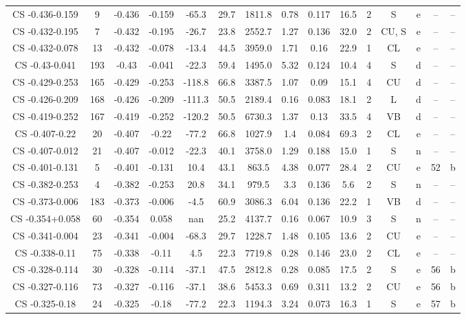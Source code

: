 \begin{table}
\begin{tabular}{ccccccccccccccc}
CS -0.436-0.159 & 9 & -0.436 & -0.159 & -65.3 & 29.7 & 1811.8 & 0.78 & 0.117 & 16.5 & 2 & S & e & -- & -- \\
CS -0.432-0.195 & 7 & -0.432 & -0.195 & -26.7 & 23.8 & 2552.7 & 1.27 & 0.136 & 32.0 & 2 & CU, S & e & -- & -- \\
CS -0.432-0.078 & 13 & -0.432 & -0.078 & -13.4 & 44.5 & 3959.0 & 1.71 & 0.16 & 22.9 & 1 & CL & e & -- & -- \\
CS -0.43-0.041 & 193 & -0.43 & -0.041 & -22.3 & 59.4 & 1495.0 & 5.32 & 0.124 & 10.4 & 4 & S & d & -- & -- \\
CS -0.429-0.253 & 165 & -0.429 & -0.253 & -118.8 & 66.8 & 3387.5 & 1.07 & 0.09 & 15.1 & 4 & CU & d & -- & -- \\
CS -0.426-0.209 & 168 & -0.426 & -0.209 & -111.3 & 50.5 & 2189.4 & 0.16 & 0.083 & 18.1 & 2 & L & d & -- & -- \\
CS -0.419-0.252 & 167 & -0.419 & -0.252 & -120.2 & 50.5 & 6730.3 & 1.37 & 0.13 & 33.5 & 4 & VB & d & -- & -- \\
CS -0.407-0.22 & 20 & -0.407 & -0.22 & -77.2 & 66.8 & 1027.9 & 1.4 & 0.084 & 69.3 & 2 & CL & e & -- & -- \\
CS -0.407-0.012 & 21 & -0.407 & -0.012 & -22.3 & 40.1 & 3758.0 & 1.29 & 0.188 & 15.0 & 1 & S & n & -- & -- \\
CS -0.401-0.131 & 5 & -0.401 & -0.131 & 10.4 & 43.1 & 863.5 & 4.38 & 0.077 & 28.4 & 2 & CU & e & 52 & b \\
CS -0.382-0.253 & 4 & -0.382 & -0.253 & 20.8 & 34.1 & 979.5 & 3.3 & 0.136 & 5.6 & 2 & S & n & -- & -- \\
CS -0.373-0.006 & 183 & -0.373 & -0.006 & -4.5 & 60.9 & 3086.3 & 6.04 & 0.136 & 22.2 & 1 & VB & d & -- & -- \\
CS -0.354+0.058 & 60 & -0.354 & 0.058 & nan & 25.2 & 4137.7 & 0.16 & 0.067 & 10.9 & 3 & S & n & -- & -- \\
CS -0.341-0.004 & 23 & -0.341 & -0.004 & -68.3 & 29.7 & 1228.7 & 1.48 & 0.105 & 13.6 & 2 & CU & e & -- & -- \\
CS -0.338-0.11 & 75 & -0.338 & -0.11 & 4.5 & 22.3 & 7719.8 & 0.28 & 0.146 & 23.0 & 2 & CL & e & -- & -- \\
CS -0.328-0.114 & 30 & -0.328 & -0.114 & -37.1 & 47.5 & 2812.8 & 0.28 & 0.085 & 17.5 & 2 & S & e & 56 & b \\
CS -0.327-0.116 & 73 & -0.327 & -0.116 & -37.1 & 38.6 & 5453.3 & 0.69 & 0.311 & 13.2 & 2 & CU & e & 56 & b \\
CS -0.325-0.18 & 24 & -0.325 & -0.18 & -77.2 & 22.3 & 1194.3 & 3.24 & 0.073 & 16.3 & 1 & S & e & 57 & b \\

\end{tabular}
\end{table}
